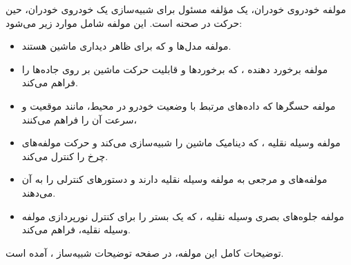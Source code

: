 مولفه خودروی خودران، یک مؤلفه مسئول برای شبیه‌سازی یک خودروی خودران، حین حرکت در صحنه است. این مولفه شامل موارد زیر می‌شود:
\begin{itemize}
    \item مولفه مدل‌ها  و  که برای ظاهر دیداری ماشین هستند.
    \item مولفه برخورد‌ دهنده ، که برخورد‌‌ها و قابلیت حرکت ماشین بر روی جاده‌ها را فراهم می‌کند.
    \item مولفه حسگر‌ها که داده‌های مرتبط با وضعیت خودرو در محیط، مانند موقعیت و سرعت آن را فراهم می‌کنند،
    \item مولفه وسیله نقلیه ،‌ که دینامیک ماشین را شبیه‌سازی می‌کند و حرکت مولفه‌های چرخ  را کنترل می‌کند.
    \item مولفه‌های  و   مرجعی به مولفه وسیله نقلیه دارند و دستورهای کنترلی را به آن می‌دهند.
    \item مولفه جلوه‌های بصری وسیله نقلیه ‌، که یک بستر را برای کنترل نورپردازی مولفه وسیله نقلیه، فراهم می‌کند.
\end{itemize}
توضیحات کامل این مولفه، در صفحه توضیحات شبیه‌ساز ، آمده است.

